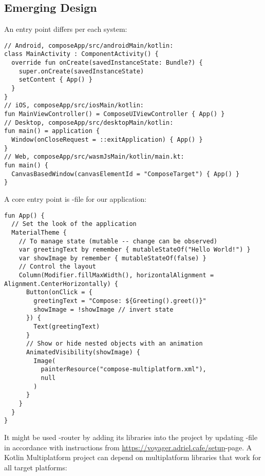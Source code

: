 
\subsection{Emerging Design}

An entry point differs per each system:

\begin{lstlisting}
// Android, composeApp/src/androidMain/kotlin:
class MainActivity : ComponentActivity() {
  override fun onCreate(savedInstanceState: Bundle?) {
    super.onCreate(savedInstanceState)
    setContent { App() }
  }
}
// iOS, composeApp/src/iosMain/kotlin:
fun MainViewController() = ComposeUIViewController { App() }
// Desktop, composeApp/src/desktopMain/kotlin:
fun main() = application {
  Window(onCloseRequest = ::exitApplication) { App() }
}
// Web, composeApp/src/wasmJsMain/kotlin/main.kt:
fun main() {
  CanvasBasedWindow(canvasElementId = "ComposeTarget") { App() }
}
\end{lstlisting}

\noindent A core entry point is -file for our application:

\begin{lstlisting}
fun App() {
  // Set the look of the application
  MaterialTheme {
    // To manage state (mutable -- change can be observed)
    var greetingText by remember { mutableStateOf("Hello World!") }
    var showImage by remember { mutableStateOf(false) }
    // Control the layout
    Column(Modifier.fillMaxWidth(), horizontalAlignment = Alignment.CenterHorizontally) {
      Button(onClick = {
        greetingText = "Compose: ${Greeting().greet()}"
        showImage = !showImage // invert state
      }) {
        Text(greetingText)
      }
      // Show or hide nested objects with an animation
      AnimatedVisibility(showImage) {
        Image(
          painterResource("compose-multiplatform.xml"),
          null
        )
      }
    }
  }
}
\end{lstlisting}

It might be used -router by adding its libraries into the project by updating 
-file in accordance with instructions from 
\href{https://voyager.adriel.cafe/setup}{https://voyager.adriel.cafe/setup}-page.
A Kotlin Multiplatform project can depend on multiplatform libraries that work for all target platforms:


